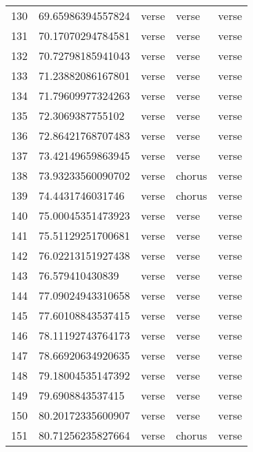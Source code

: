 \begin{table}[]
\begin{tabular}{lllll}
    130  & 69.65986394557824  & verse        & verse           & verse          \\
    131  & 70.17070294784581  & verse        & verse           & verse          \\
    132  & 70.72798185941043  & verse        & verse           & verse          \\
    133  & 71.23882086167801  & verse        & verse           & verse          \\
    134  & 71.79609977324263  & verse        & verse           & verse          \\
    135  & 72.3069387755102   & verse        & verse           & verse          \\
    136  & 72.86421768707483  & verse        & verse           & verse          \\
    137  & 73.42149659863945  & verse        & verse           & verse          \\
    138  & 73.93233560090702  & verse        & chorus          & verse          \\
    139  & 74.4431746031746   & verse        & chorus          & verse          \\
    140  & 75.00045351473923  & verse        & verse           & verse          \\
    141  & 75.51129251700681  & verse        & verse           & verse          \\
    142  & 76.02213151927438  & verse        & verse           & verse          \\
    143  & 76.579410430839    & verse        & verse           & verse          \\
    144  & 77.09024943310658  & verse        & verse           & verse          \\
    145  & 77.60108843537415  & verse        & verse           & verse          \\
    146  & 78.11192743764173  & verse        & verse           & verse          \\
    147  & 78.66920634920635  & verse        & verse           & verse          \\
    148  & 79.18004535147392  & verse        & verse           & verse          \\
    149  & 79.6908843537415   & verse        & verse           & verse          \\
    150  & 80.20172335600907  & verse        & verse           & verse          \\
    151  & 80.71256235827664  & verse        & chorus          & verse          \\

\end{tabular}
\end{table}
